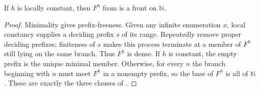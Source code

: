 \begin{lemma}
If $h$ is locally constant, then $F^h$ from  is a
front on $\mathbb N$.
\end{lemma}
\begin{proof}
Minimality gives prefix-freeness.  Given any infinite enumeration $x$,
local constancy  supplies a deciding prefix $s$
of its range.  Repeatedly remove proper deciding prefixes; finiteness of
$s$ makes this process terminate at a member of $F^h$ still lying on the
same branch.  Thus $F^h$ is dense.  If $h$ is constant, the empty prefix is
the unique minimal member.  Otherwise, for every $n$ the branch beginning
with $n$ must meet $F^h$ in a nonempty prefix, so the base of $F^h$ is all
of $\mathbb N$.  These are exactly the three clauses of .
\end{proof}
